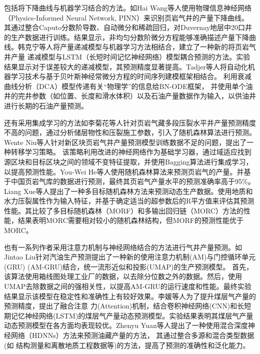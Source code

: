 包括将下降曲线与机器学习结合的方法。如Hai Wang\cite{WANG2024123387}等人使用物理信息神经网络（Physics-Informed Neural Network, PINN）来识别页岩气井的产量下降曲线。
其通过整合Caputo分数阶导数、自动微分和稀疏回归，对Duvernay地层中20口井的生产数据进行训练。结果显示，非均匀分数阶微分方程能够准确描述产量下降曲线。韩克宁等人\cite{KTDQ202305012}将产量递减模型与机器学习方法相结合，建立了一种新的将页岩气井产量
递减模型与LSTM（长短时间记忆神经网络）模型耦合预测的方法。实验结果显示对于误差较大的递减模型，其预测精度显著提高。Tadjer等人\cite{10.2118/209616-PA}将自动化机器学习技术与基于贝叶斯神经常微分方程的时间序列建模框架相结合。
利用衰减曲线分析（DCA）模型传递有关“物理学”的信息给BN-ODE框架，
并使用单个油井的完井参数（如位置、长度和滑水体积）以及石油产量数据作为输入，以供油井进行长期的石油产量预测。

还有采用集成学习的方法如李菊花等人\cite{CJDL202004006}针对页岩气藏多段压裂水平井产量预测精度不高的问题，通过分析储层物性和压裂施工参数，引入了随机森林算法进行预测。Wente Niu等人\cite{NIU2023127443}针对新区块页岩气井产量预测模型训练数据不足的问题，提出了一种转移学习策略。
该策略利用改进的神经网络作为基础学习器，通过域适应找到源区块和目标区块之间的领域不变特征提取，并使用Bagging算法进行集成学习，以提高预测性能。You-Wei He等人\cite{HE20231659}使用随机森林算法来预测页岩气的产量。并基于中国页岩气库的数据进行预测，最终其页岩气产量水平的预测准确率高于95\%。
Liang Xue等人\cite{XUE2021107801}提出了一种多目标随机森林方法来预测动态生产数据。使用地质和水力压裂属性作为输入特征，并基于确定适当的超参数后的R平方值来评估其预测性能。其比较了多目标随机森林（MORF）和多输出回归链（MORC）方法的性能，结果表明MORC需要相对较小的随机森林结构，但MORF的预测性能优于MORC。

也有一系列作者采用注意力机制与神经网络结合的方法进行气井产量预测。如Jintao Liu\cite{LIU2023125536}针对汽油生产预测提出了一种新的使用注意力机制(AM)与门控循环单元(GRU) (AM-GRU)结合，统一流形近似和投影(UMAP)的生产预测模型。
首先，该算法使用箱线图处理工业厂的数据，以去除分位数之外的数据。然后，使用UMAP去除数据之间的强相关性，以提高AM-GRU的运行速度和性能。最终实验结果显示该模型在稳定性和准确性上有较好效果。李媛等人\cite{KXJS202302015}为了提升煤层气产量的预测精度，提出了融合注意
力(Attention)机制，结合卷积神经网络(CNN)和长短期记忆神经网络(LSTM)的煤层气产量动态预测模型。实验结果表明其煤层气产量动态预测模型在各方面均表现较优。Zhenyu Yuan\cite{YUAN2021108111}等人提出了一种使用混合深度神经网络（HDNNs）方法来预测油藏产量的方法，
其通过整合多源和混合类型数据(如
结构测量和离散地质工程数据等)的方法，提高了预测的准确性和泛化能力。

